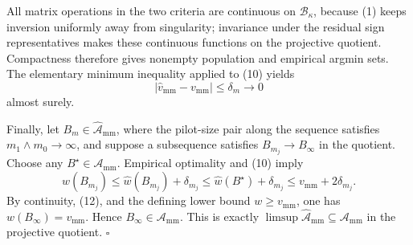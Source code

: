 All matrix operations in the two criteria are continuous on \(\mathcal B_\kappa\), because (1) keeps inversion uniformly away from singularity; invariance under the residual sign representatives makes these continuous functions on the projective quotient.  Compactness therefore gives nonempty population and empirical argmin sets.  The elementary minimum inequality applied to (10) yields
\[
 \left\lvert\widehat v_{\mathrm{mm}}-v_{\mathrm{mm}}\right\rvert
 \le\delta_m\longrightarrow0
 \tag{11}
\]
almost surely.

Finally, let \(B_m\in\widehat{\mathcal A}_{\mathrm{mm}}\), where the pilot-size pair along the sequence satisfies \(m_1\wedge m_0\to\infty\), and suppose a subsequence satisfies \(B_{m_j}\to B_\infty\) in the quotient.  Choose any \(B^\star\in\mathcal A_{\mathrm{mm}}\).  Empirical optimality and (10) imply
\[
 w(B_{m_j})
 \le \widehat w(B_{m_j})+\delta_{m_j}
 \le \widehat w(B^\star)+\delta_{m_j}
 \le v_{\mathrm{mm}}+2\delta_{m_j}.
 \tag{12}
\]
By continuity, (12), and the defining lower bound \(w\ge v_{\mathrm{mm}}\), one has \(w(B_\infty)=v_{\mathrm{mm}}\).  Hence \(B_\infty\in\mathcal A_{\mathrm{mm}}\).  This is exactly
\(\limsup\widehat{\mathcal A}_{\mathrm{mm}}\subseteq\mathcal A_{\mathrm{mm}}\) in the projective quotient.  \(\square\)